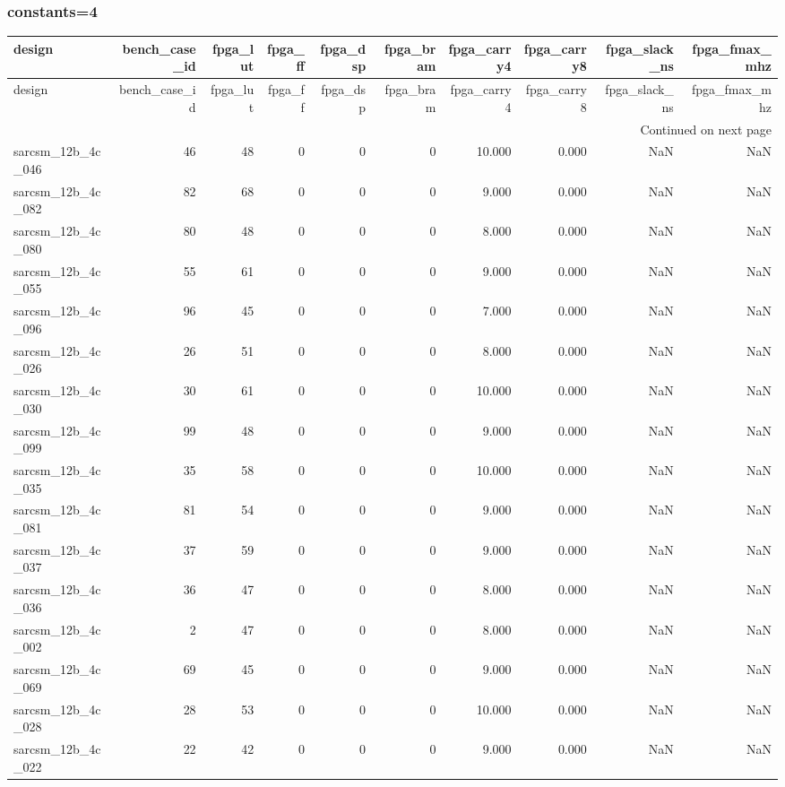 \documentclass{article}
\begin{document}
\subsubsection*{constants=4}
\begin{longtable}{lrrrrrrrrr}
\toprule
design & bench\_case\_id & fpga\_lut & fpga\_ff & fpga\_dsp & fpga\_bram & fpga\_carry4 & fpga\_carry8 & fpga\_slack\_ns & fpga\_fmax\_mhz \\
\midrule
\endfirsthead
\toprule
design & bench\_case\_id & fpga\_lut & fpga\_ff & fpga\_dsp & fpga\_bram & fpga\_carry4 & fpga\_carry8 & fpga\_slack\_ns & fpga\_fmax\_mhz \\
\midrule
\endhead
\midrule
\multicolumn{10}{r}{Continued on next page} \\
\midrule
\endfoot
\bottomrule
\endlastfoot
sarcsm\_12b\_4c\_046 & 46 & 48 & 0 & 0 & 0 & 10.000 & 0.000 & NaN & NaN \\
sarcsm\_12b\_4c\_082 & 82 & 68 & 0 & 0 & 0 & 9.000 & 0.000 & NaN & NaN \\
sarcsm\_12b\_4c\_080 & 80 & 48 & 0 & 0 & 0 & 8.000 & 0.000 & NaN & NaN \\
sarcsm\_12b\_4c\_055 & 55 & 61 & 0 & 0 & 0 & 9.000 & 0.000 & NaN & NaN \\
sarcsm\_12b\_4c\_096 & 96 & 45 & 0 & 0 & 0 & 7.000 & 0.000 & NaN & NaN \\
sarcsm\_12b\_4c\_026 & 26 & 51 & 0 & 0 & 0 & 8.000 & 0.000 & NaN & NaN \\
sarcsm\_12b\_4c\_030 & 30 & 61 & 0 & 0 & 0 & 10.000 & 0.000 & NaN & NaN \\
sarcsm\_12b\_4c\_099 & 99 & 48 & 0 & 0 & 0 & 9.000 & 0.000 & NaN & NaN \\
sarcsm\_12b\_4c\_035 & 35 & 58 & 0 & 0 & 0 & 10.000 & 0.000 & NaN & NaN \\
sarcsm\_12b\_4c\_081 & 81 & 54 & 0 & 0 & 0 & 9.000 & 0.000 & NaN & NaN \\
sarcsm\_12b\_4c\_037 & 37 & 59 & 0 & 0 & 0 & 9.000 & 0.000 & NaN & NaN \\
sarcsm\_12b\_4c\_036 & 36 & 47 & 0 & 0 & 0 & 8.000 & 0.000 & NaN & NaN \\
sarcsm\_12b\_4c\_002 & 2 & 47 & 0 & 0 & 0 & 8.000 & 0.000 & NaN & NaN \\
sarcsm\_12b\_4c\_069 & 69 & 45 & 0 & 0 & 0 & 9.000 & 0.000 & NaN & NaN \\
sarcsm\_12b\_4c\_028 & 28 & 53 & 0 & 0 & 0 & 10.000 & 0.000 & NaN & NaN \\
sarcsm\_12b\_4c\_022 & 22 & 42 & 0 & 0 & 0 & 9.000 & 0.000 & NaN & NaN \\

\end{longtable}
\end{document}
